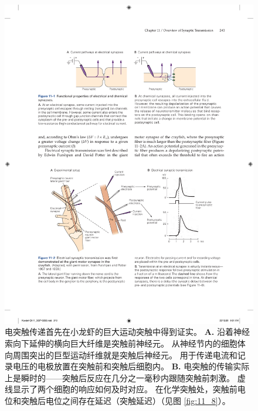\begin{figure}[htbp]
	\centering
	\includegraphics[width=0.8\linewidth]{chap11/fig_11_2}
	\caption{电突触传递首先在小龙虾的巨大运动突触中得到证实\cite{furshpan1959transmission,furshpan1957mechanism}。 
		\textbf{A.} 沿着神经索向下延伸的横向巨大纤维是突触前神经元。
		从神经节内的细胞体向周围突出的巨型运动纤维就是突触后神经元。
		用于传递电流和记录电压的电极放置在突触前和突触后细胞内。
		\textbf{B.} 电突触的传输实际上是瞬时的——突触后反应在几分之一毫秒内跟随突触前刺激。
		虚线显示了两个细胞的响应如何及时对应。
		在化学突触处，突触前电位和突触后电位之间存在延迟（突触延迟）（见图 \ref{fig:11_8}）。}
	\label{fig:11_2}
\end{figure}


